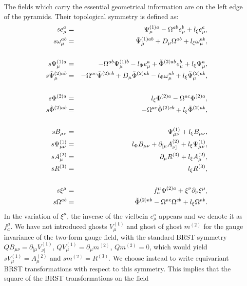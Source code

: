 \documentclass[a4paper,12pt]{article}
\def\L{l}
\begin{document}
The fields which carry  the essential geometrical information are on the
left edge of the pyramids. Their topological symmetry is defined
as:
\begin{eqnarray}
se^a_\mu &=& \Psi^{(1)a}_\mu-\O^{ab} e^b_\mu  + \L_\xi e^a_\mu ,\nonumber
\\ s\o^{ab}_\mu &=&   \t \Psi^{(1)ab}_\mu+
D_\mu\O^{ab}  + \L_\xi \o^{ab}_\mu, 
\nonumber\\
\nonumber\\ 
s\Psi^{(1)a}_\mu &=&  -\O^{ab} \Psi^{(1)b}_\mu-\L_\Phi
e^a_\mu +\t \Phi^{(2)ab}e^b_\mu +\L_\xi  \Psi^a_\mu,
\nonumber\\
s \t \Psi ^{(2)ab}_\mu &=& -\O ^{ac}\t
\Psi^{(2)cb}  + D_\mu \t \Phi^{(2)ab} -\L _\Phi \o^{ab}_\mu 
+ \L_\xi  \t\Psi ^{(2)ab}_\mu,
\nonumber\\
\nonumber\\
s  \Phi ^{(2)a}  &=& \L_\xi   \Phi ^{(2)a } -\O ^{ac} \Phi^{(2)a}  ,
\nonumber\\
s \t \Phi ^{(2)ab}  &=&  -\O ^{ac}\t \Phi^{(2)cb}  
+\L_\xi  \t\Phi ^{(2)ab},
\nonumber\\
\nonumber\\
sB_{\mu\nu} &=& 
\Psi^{(1)}_{\mu\nu}
+\L_\xi B_{\mu\nu},
\nonumber \\ 
s\Psi^{(1)}_{\mu\nu} &=&\L_\Phi B_{\mu\nu}
 +\partial_{[\mu} A^{(2)}_{ \nu]} + \L_\xi \Psi^{(1)}_{\mu\nu},
\nonumber \\ 
sA^{(2)}_{\mu } &=& \partial_{\mu} R^{(3)} + \L_\xi A^{(2)}_{\mu } ,
\nonumber \\ 
s R^{(3)} &=& \L_\xi   R^{(3)} ,
\nonumber\\
\nonumber\\ 
s\xi^\mu  &=& f_a^\mu \Phi^{(2)a}+\xi^\nu \partial _\nu \xi^\mu,
\nonumber\\
s \O ^{ab} &=& \t \Phi^{(2)ab} -\O ^{ac}\O^{cb}  + \L_\xi  \O ^{ab}  .
\label{brs} 
\end{eqnarray}
In the variation of $\xi^\mu$, the inverse of the vielbein $e_\mu^a$
appears and we denote it as $f_a^\mu $.
We have  not introduced   ghosts $V_\mu^{(1) }$ and ghost of ghost $ 
m^{(2)}$ for    the gauge invariance of the two-form gauge field, with the
standard BRST symmetry
$QB_{\mu\nu}=\partial _{[\mu} V^{(1) }_{\nu]}$,
$QV^{(1) }_{\mu}=\partial _{ \mu} m^{(2) }$, $Qm^{(2) }=0$, which would
yield   $s V^{(1)}_\mu=A^{(2)}_\mu$ and
$sm^{(2)}= R^{(3)}$.  
We choose instead to write equivariant BRST transformations 
with respect to this symmetry. This implies that 
the square of the BRST transformations on the field 
\end{document}
